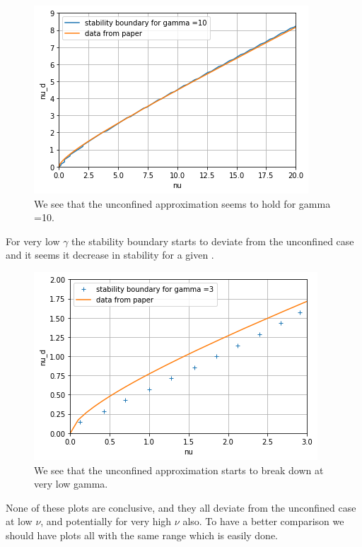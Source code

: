\documentclass[10pt]{article}
\numberwithin{equation}{section}
\begin{document}
\begin{multicols}{2}
\begin{figure}[H]
\centering
\includegraphics[width=\linewidth]{gamma =10}
\caption{We see that the unconfined approximation seems to hold for gamma =10.}
\end{figure}

For very low $\gamma$ the stability boundary starts to deviate from the unconfined case and it seems it decrease in stability for a given \scalebox{1.1}{$\nu$}.
\begin{figure}[H]
\centering
\includegraphics[width=\linewidth]{gamma = 3}
\caption{We see that the unconfined approximation starts to break down at very low gamma.}
\end{figure}

None of these plots are conclusive, and they all deviate from the unconfined case at low $\nu$, and potentially for very high $\nu$ also. To have a better comparison we should have plots all with the same range which is easily done. 


\end{multicols}
\end{document}
